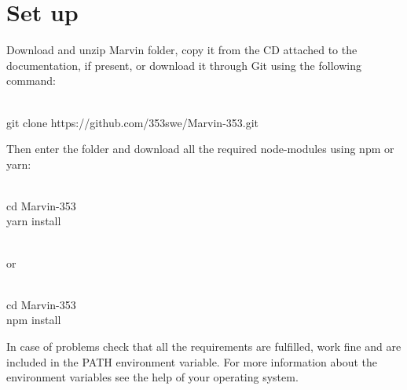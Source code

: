 \documentclass[ManualeSviluppatore]{subfiles}
\begin{document}
\section{Set up}
Download and unzip Marvin folder, copy it from the CD attached to the documentation, if present, or download it through Git using the following command: \\\\
\begin{ttfamily}
\indent git clone https://github.com/353swe/Marvin-353.git \\
\end{ttfamily}

Then enter the folder and download all the required node-modules using npm or yarn: \\\\
\begin{ttfamily}
\indent cd Marvin-353 \\
\indent yarn install \\\\
\end{ttfamily}
or \\\\
\begin{ttfamily}
\indent cd Marvin-353 \\
\indent npm install \\
\end{ttfamily}

In case of problems check that all the requirements are fulfilled, work fine and are included in the PATH environment variable. For more information about the environment variables see the help of your operating system. \\
\end{document}
